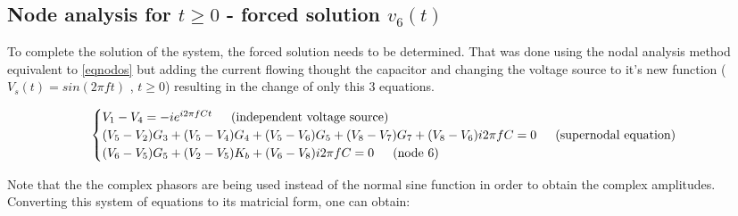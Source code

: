 \subsection{Node analysis for $t\geq0$ - forced solution $v_6(t)$}

To complete the solution of the system, the forced solution needs to be determined. That was done using the nodal analysis method equivalent to \ref{eqnodos} but adding the current flowing thought the capacitor and changing the voltage source to it's new function ($V_s(t)=sin(2\pi f t)$ , $t\geq0$) resulting in the change of only this 3 equations.

\begin{equation}
    \begin{cases}
        V_1 - V_4 = -i e^{i 2\pi f C t} \hspace{15px} \text{(independent voltage source)}\\
        (V_5-V_2)G_3 + (V_5-V_4)G_4 + (V_5-V_6)G_5 + (V_8-V_7)G_7 + (V_8-V_6)i 2\pi f C = 0 \hspace{15px}\text{(supernodal equation)}\\
        (V_6-V_5)G_5 + (V_2-V_5)K_b + (V_6-V_8)i 2\pi f C = 0 \hspace{15px}\text{(node 6)}\\
    \end{cases}
\end{equation}

Note that the the complex phasors are being used instead of the normal sine function in order to obtain the complex amplitudes. Converting this system of equations to its matricial form, one can obtain:


